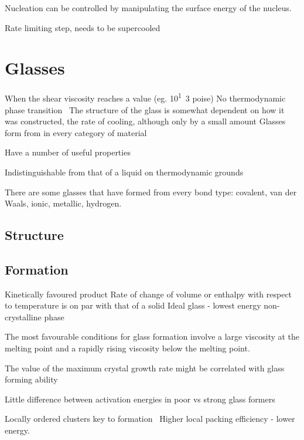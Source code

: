 Nucleation can be controlled by manipulating the surface energy of the nucleus.~\cite{de-yoreo:03}
 
Rate limiting step, needs to be supercooled
 
\section{Glasses}
When the shear viscosity reaches a value (eg. \si{10^13} poise)
No thermodynamic phase transition~\cite{santen:00}
The structure of the glass is somewhat dependent on how it was constructed, the rate of cooling, although only by a small amount
Glasses form from in every category of material~\cite{turnbull:69}

Have a number of useful properties~\cite{greer:07}

Indistinguishable from that of a liquid on thermodynamic grounds~\cite{santen:00}

There are some glasses that have formed from every bond type: covalent, van der Waals, ionic, metallic, hydrogen.~\cite{turnbull:69}

\subsection{Structure}


\subsection{Formation}
Kinetically favoured product
Rate of change of volume or enthalpy with respect to temperature is on par with that of a solid
Ideal glass - lowest energy non-crystalline phase

The most favourable conditions for glass formation involve a large viscosity at the melting point and a rapidly rising viscosity below the melting point.~\cite{uhlmann:72}



The value of the maximum crystal growth rate might be correlated with glass forming ability~\cite{tang:13}

Little difference between activation energies in poor vs strong glass formers~\cite{tang:13}

Locally ordered clusters key to formation~\cite{yang:12} Higher local packing efficiency - lower energy. 

